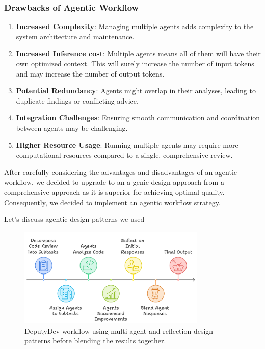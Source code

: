 \subsubsection{Drawbacks of Agentic Workflow}
\begin{enumerate}
    \item \textbf{Increased Complexity}: Managing multiple agents adds complexity to the system architecture and maintenance.
    \item \textbf{Increased Inference cost}: Multiple agents means all of them will have their own optimized context. This will surely increase the number of input tokens and may increase the number of output tokens.
    \item \textbf{Potential Redundancy}: Agents might overlap in their analyses, leading to duplicate findings or conflicting advice.
    \item \textbf{Integration Challenges}: Ensuring smooth communication and coordination between agents may be challenging.
    \item \textbf{Higher Resource Usage}: Running multiple agents may require more computational resources compared to a single, comprehensive review.
\end{enumerate}

After carefully considering the advantages and disadvantages of an agentic workflow, we decided to upgrade to an a
genic design approach from a comprehensive approach as it is superior for achieving optimal quality. Consequently, we decided to implement an agentic workflow strategy.

Let's discuss agentic design patterns we used-

\begin{figure}[htbp]
    \centering
    \includegraphics[width=0.8\textwidth]
    {Figures/workflow.png}
    \caption{DeputyDev workflow using multi-agent and reflection design patterns before blending the results together.}
    \label{fig:DeputyDev-workflow}
\end{figure}


